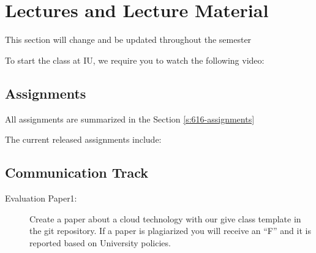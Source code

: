 \section{Lectures and Lecture Material}\label{S:lectures-516}

\begin{WARNING}
This section will change and be updated throughout the semester
\end{WARNING}


\begin{IU}

To start the class at IU, we require you to watch the following video:


\end{IU}

\subsection{Assignments}

All assignments are summarized in the Section \ref{s:616-assignments}

The current released assignments include:



\subsection{Communication Track}




\begin{description}
\item[Evaluation Paper1:] Create a paper about a cloud technology with
  our give class template in the git repository. If a paper is
  plagiarized you will receive an ``F'' and it is reported based on
  University policies.
\end{description}


